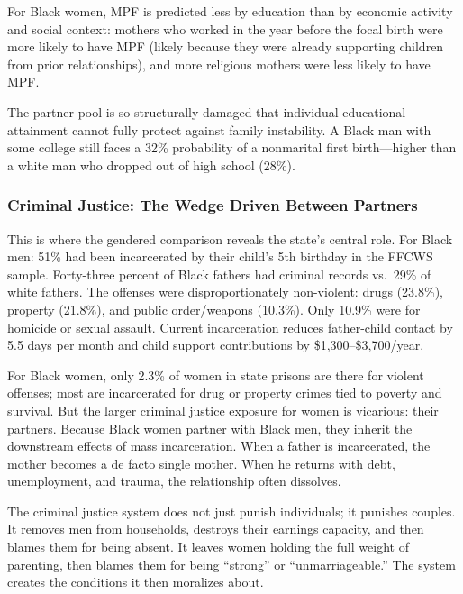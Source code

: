 For Black women, MPF is predicted less by education than by economic activity and social context: mothers who worked in the year before the focal birth were more likely to have MPF (likely because they were already supporting children from prior relationships), and more religious mothers were less likely to have MPF.

The partner pool is so structurally damaged that individual educational attainment cannot fully protect against family instability. A Black man with some college still faces a 32\% probability of a nonmarital first birth---higher than a white man who dropped out of high school (28\%).

\subsubsection{Criminal Justice: The Wedge Driven Between Partners}

This is where the gendered comparison reveals the state's central role. For Black men: 51\% had been incarcerated by their child's 5th birthday in the FFCWS sample. Forty-three percent of Black fathers had criminal records vs.~29\% of white fathers. The offenses were disproportionately non-violent: drugs (23.8\%), property (21.8\%), and public order/weapons (10.3\%). Only 10.9\% were for homicide or sexual assault. Current incarceration reduces father-child contact by 5.5 days per month and child support contributions by \$1,300--\$3,700/year.

For Black women, only 2.3\% of women in state prisons are there for violent offenses; most are incarcerated for drug or property crimes tied to poverty and survival. But the larger criminal justice exposure for women is vicarious: their partners. Because Black women partner with Black men, they inherit the downstream effects of mass incarceration. When a father is incarcerated, the mother becomes a de facto single mother. When he returns with debt, unemployment, and trauma, the relationship often dissolves.

The criminal justice system does not just punish individuals; it punishes couples. It removes men from households, destroys their earnings capacity, and then blames them for being absent. It leaves women holding the full weight of parenting, then blames them for being ``strong'' or ``unmarriageable.'' The system creates the conditions it then moralizes about.

